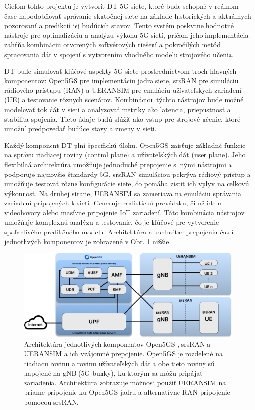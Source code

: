 \par{
Cieľom tohto projektu je vytvoriť DT 5G siete, ktoré bude schopné v reálnom čase napodobňovať správanie skutočnej siete na základe historických a aktuálnych pozorovaní a predikcií jej budúcich stavov. Tento systém poskytne hodnotné nástroje pre optimalizáciu a analýzu výkonu 5G sietí, pričom jeho implementácia zahŕňa kombináciu otvorených softvérových riešení a pokročilých metód spracovania dát v spojení s vytvorením vhodného modelu strojového učenia.
}

\par{
DT bude simulovať kľúčové aspekty 5G siete prostredníctvom troch hlavných komponentov: Open5GS pre implementáciu jadra siete, srsRAN pre simuláciu rádiového prístupu (RAN) a UERANSIM pre emuláciu užívateľských zariadení (UE) a testovanie rôznych scenárov. Kombináciou týchto nástrojov bude možné modelovať tok dát v sieti a analyzovať metriky ako latencia, priepustnosť a stabilita spojenia. Tieto údaje budú slúžiť ako vstup pre strojové učenie, ktoré umožní predpovedať budúce stavy a zmeny v sieti.
}

\par{
Každý komponent DT plní špecifickú úlohu. Open5GS zaisťuje základné funkcie na správu riadiacej roviny (control plane) a užívateľských dát (user plane). Jeho flexibilná architektúra umožňuje jednoduché prepojenie s inými nástrojmi a podporuje najnovšie štandardy 5G. srsRAN simuláciou pokrýva rádiový prístup a umožňuje testovať rôzne konfigurácie siete, čo pomáha zistiť ich vplyv na celkovú výkonnosť. Na druhej strane, UERANSIM sa zameriava na emuláciu správania zariadení pripojených k sieti. Generuje realistickú prevádzku, či už ide o videohovory alebo masívne pripojenie IoT zariadení. Táto kombinácia nástrojov umožňuje komplexnú analýzu a testovanie, čo je kľúčové pre vytvorenie spoľahlivého predikčného modelu. Architektúra a konkrétne prepojenia častí jednotlivých komponentov je zobrazené v Obr. \ref{fig:architecture} nižšie.
}
\newline
\begin{figure}[H]
    \centering
    \includegraphics[width=0.75\linewidth]{assets/images/open5gs+ueran.png}
    \caption{Architektúra jednotlivých komponentov Open5GS \cite{open5gs}, srsRAN a UERANSIM a ich vzájomné prepojenie. Open5GS je rozdelené na riadiacu rovinu a rovinu užívateľských dát a obe tieto roviny sú napojené na gNB (5G bunky), ku ktorým sa môžu pripájať zariadenia. Architektúra zobrazuje možnosť použiť UERANSIM na priame pripojenie ku Open5GS jadru a alternatívne RAN pripojenie pomocou srsRAN.}
    \label{fig:architecture}
\end{figure}

